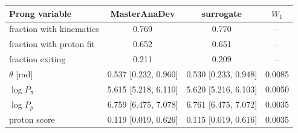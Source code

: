 \begin{tabular}{lccc}
\toprule
Prong variable & MasterAnaDev & surrogate & $W_1$ \\
\midrule
fraction with kinematics & 0.769 & 0.770 & -- \\
fraction with proton fit & 0.652 & 0.651 & -- \\
fraction exiting & 0.211 & 0.209 & -- \\
$\theta$ [rad] & 0.537 [0.232, 0.960] & 0.530 [0.233, 0.948] & 0.0085 \\
$\log P_\pi$ & 5.615 [5.218, 6.110] & 5.620 [5.216, 6.103] & 0.0050 \\
$\log P_p$ & 6.759 [6.475, 7.078] & 6.761 [6.475, 7.072] & 0.0035 \\
proton score & 0.119 [0.019, 0.626] & 0.115 [0.019, 0.616] & 0.0035 \\
\bottomrule
\end{tabular}
